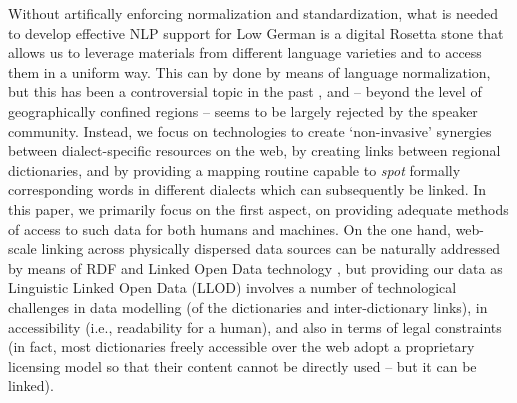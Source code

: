 Without artifically enforcing normalization and standardization, what is needed to develop effective NLP support for Low German is a digital Rosetta stone that allows us to leverage materials from different language varieties and to access them in a uniform way. This can by done by means of language normalization, but this has been a controversial topic in the past \cite{Christiansen1975}, and -- beyond the level of geographically confined regions -- seems to be largely rejected by the speaker community. Instead, we focus on technologies to create `non-invasive' synergies between dialect-specific resources on the web, by creating links between regional dictionaries, and by providing a mapping routine capable to \emph{spot} formally corresponding words in different dialects which can subsequently be linked. In this paper, we primarily focus on the first aspect, on providing adequate methods of access to such data for both humans and machines. On the one hand, web-scale linking across physically dispersed data sources can be naturally addressed by means of RDF and Linked Open Data technology \cite{cimiano-et-al-2020-lld-intro}, but providing our data as Linguistic Linked Open Data (LLOD) involves a number of technological challenges in data modelling (of the dictionaries and inter-dictionary links), in accessibility (i.e., readability for a human), and also in terms of legal constraints (in fact, most dictionaries freely accessible over the web adopt a proprietary licensing model so that their content cannot be directly used -- but it can be linked).

